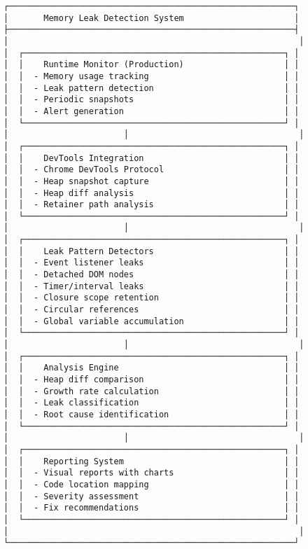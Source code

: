 \documentclass[11pt]{article}
\begin{document}
\begin{verbatim}
┌─────────────────────────────────────────────────────────┐
│       Memory Leak Detection System                      │
├─────────────────────────────────────────────────────────┤
│                                                          │
│  ┌────────────────────────────────────────────────────┐ │
│  │    Runtime Monitor (Production)                    │ │
│  │  - Memory usage tracking                           │ │
│  │  - Leak pattern detection                          │ │
│  │  - Periodic snapshots                              │ │
│  │  - Alert generation                                │ │
│  └────────────────────────────────────────────────────┘ │
│                       │                                  │
│  ┌────────────────────────────────────────────────────┐ │
│  │    DevTools Integration                            │ │
│  │  - Chrome DevTools Protocol                        │ │
│  │  - Heap snapshot capture                           │ │
│  │  - Heap diff analysis                              │ │
│  │  - Retainer path analysis                          │ │
│  └────────────────────────────────────────────────────┘ │
│                       │                                  │
│  ┌────────────────────────────────────────────────────┐ │
│  │    Leak Pattern Detectors                          │ │
│  │  - Event listener leaks                            │ │
│  │  - Detached DOM nodes                              │ │
│  │  - Timer/interval leaks                            │ │
│  │  - Closure scope retention                         │ │
│  │  - Circular references                             │ │
│  │  - Global variable accumulation                    │ │
│  └────────────────────────────────────────────────────┘ │
│                       │                                  │
│  ┌────────────────────────────────────────────────────┐ │
│  │    Analysis Engine                                 │ │
│  │  - Heap diff comparison                            │ │
│  │  - Growth rate calculation                         │ │
│  │  - Leak classification                             │ │
│  │  - Root cause identification                       │ │
│  └────────────────────────────────────────────────────┘ │
│                       │                                  │
│  ┌────────────────────────────────────────────────────┐ │
│  │    Reporting System                                │ │
│  │  - Visual reports with charts                      │ │
│  │  - Code location mapping                           │ │
│  │  - Severity assessment                             │ │
│  │  - Fix recommendations                             │ │
│  └────────────────────────────────────────────────────┘ │
│                                                          │
└─────────────────────────────────────────────────────────┘
\end{verbatim}
\end{document}
